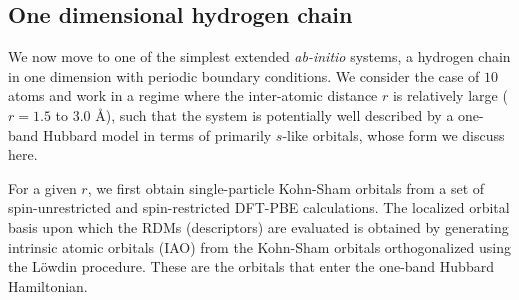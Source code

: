 
\subsection{One dimensional hydrogen chain}
\label{subsection:1dhydrogen}
We now move to one of the simplest extended \emph{ab-initio} systems, a hydrogen chain in one dimension with periodic boundary conditions. 
We consider the case of $10$ atoms and work in a regime where the inter-atomic distance $r$ is 
relatively large ($r=1.5$ to $3.0$ \AA), such that the system is potentially well described by a one-band Hubbard model 
in terms of primarily $s$-like orbitals, whose form we discuss here. 

For a given $r$, we first obtain single-particle Kohn-Sham orbitals from a set of spin-unrestricted and 
spin-restricted DFT-PBE calculations. The localized orbital basis upon which the RDMs (descriptors) 
are evaluated is obtained by generating intrinsic atomic orbitals (IAO) from the Kohn-Sham orbitals 
orthogonalized using the L\"owdin procedure. These are the orbitals that enter the one-band Hubbard Hamiltonian. 


